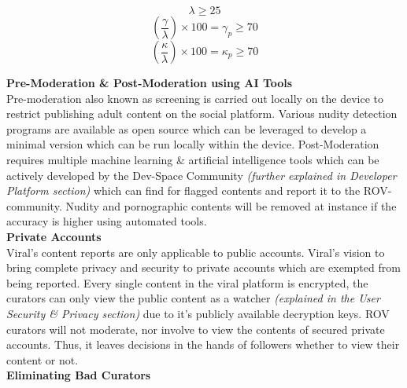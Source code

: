 \documentclass[10pt]{article}
\begin{document}
\begin{equation}
\lambda \geq25
\end{equation}
\begin{equation}
(\frac{\gamma}{\lambda}) \times  100 = \gamma_p \geq 70
\end{equation}
\begin{equation}
(\frac{\kappa}{\lambda}) \times  100 = \kappa_p \geq 70
\end{equation}


\textbf{Pre-Moderation \& Post-Moderation using AI Tools}\\

Pre-moderation also known as screening is carried out locally on the device to restrict publishing adult content on the social platform. Various nudity detection programs are available as open source which can be leveraged to develop a minimal version which can be run locally within the device. Post-Moderation requires multiple machine learning \& artificial intelligence tools which can be actively developed by the Dev-Space Community \textit{(further explained in Developer Platform section)} which can find for flagged contents and report it to the ROV-community. Nudity and pornographic contents will be removed at instance if the accuracy is higher using automated tools.\\

\textbf{Private Accounts}\\

Viral’s content reports are only applicable to public accounts. Viral’s vision to bring complete privacy and security to private accounts which are exempted from being reported.  Every single content in the viral platform is encrypted, the curators can only view the public content as a watcher \textit{(explained in the User Security \& Privacy section)} due to it's publicly available decryption keys. ROV curators will not moderate, nor involve to view the contents of secured private accounts. Thus, it leaves decisions in the hands of followers whether to view their content or not. \\

\textbf{Eliminating Bad Curators}\\
\end{document}

